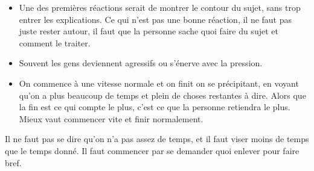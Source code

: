 \documentclass[final, a4paper, 11pt]{article}
\begin{document}
\begin{itemize}
	\item Une des premières réactions serait de montrer le contour du sujet, sans trop entrer les explications. Ce qui n'est pas une bonne réaction, il ne faut pas juste rester autour, il faut que la personne sache quoi faire du sujet et comment le traiter.
	
	\item Souvent les gens deviennent agressifs ou s'énerve avec la pression.
	
	\item On commence à une vitesse normale et on finit on se précipitant, en voyant qu'on a plus beaucoup de temps et plein de choses restantes à dire. Alors que la fin est ce qui compte le plus, c'est ce que la personne retiendra le plus. Mieux vaut commencer vite et finir normalement.
\end{itemize}

Il ne faut pas se dire qu'on n'a pas assez de temps, et il faut viser moins de temps que le temps donné. Il faut commencer par se demander quoi enlever pour faire bref.
\end{document}
